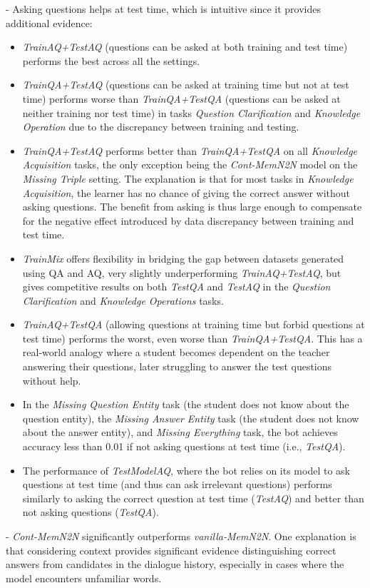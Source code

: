 - Asking questions helps at test time, which is intuitive since it provides additional evidence:
\begin{itemize}
\item  {\it TrainAQ+TestAQ} (questions can be asked at both training and test time) performs the best across all the settings.
\item {\it TrainQA+TestAQ} (questions can be asked at training time but not at test time) performs worse than {\it TrainQA+TestQA} (questions can be asked at neither training nor test time) in tasks {\it Question Clarification} and {\it Knowledge Operation} due to the discrepancy between training and testing.
\item   {\it TrainQA+TestAQ}  performs better than {\it TrainQA+TestQA}  on all {\it Knowledge Acquisition} tasks, the only exception being the {\it Cont-MemN2N} model on the {\it Missing Triple} setting. The explanation is that for most tasks in {\it Knowledge Acquisition}, the learner has no chance of giving the correct answer without asking questions. The benefit from asking is thus large enough to compensate for the negative effect introduced by data discrepancy between training and test time.
\item {\it TrainMix} offers flexibility in bridging the gap between datasets generated using QA and AQ, very slightly underperforming {\it TrainAQ+TestAQ}, but gives competitive results on both {\it TestQA} and {\it TestAQ} in  the {\it Question Clarification} and {\it Knowledge Operations} tasks.
\item {\it TrainAQ+TestQA} (allowing questions at training time but forbid questions at test time) performs the worst, even worse than
{\it TrainQA+TestQA}. This has a real-world analogy where a student becomes dependent on the teacher answering their questions, later struggling to answer the test questions without help.
\item In the {\it Missing Question Entity} task (the student does not know about the question entity), the {\it Missing Answer Entity} task (the student does not know about the answer entity), and {\it Missing Everything} task, the bot achieves accuracy less than 0.01  if
not asking questions at test time (i.e., {\it TestQA}).
\item The performance of {\it TestModelAQ}, where the bot relies on its model to ask questions at test time (and thus can ask irrelevant questions) performs similarly to asking the correct question at test time ({\it TestAQ}) and better than not asking questions ({\it TestQA}).
\end{itemize}
- {\it Cont-MemN2N} significantly outperforms {\it vanilla-MemN2N}. One explanation
is that considering context provides significant evidence distinguishing correct
answers from candidates in the dialogue history, %
especially in cases where the model encounters unfamiliar words.




